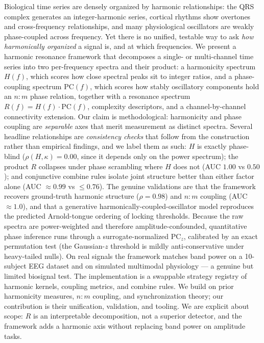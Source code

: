 \documentclass[11pt]{article}
\begin{document}
{\small Biological time series are densely organized by harmonic relationships: the QRS complex generates an integer-harmonic series, cortical rhythms show overtones and cross-frequency relationships, and many physiological oscillators are weakly phase-coupled across frequency. Yet there is no unified, testable way to ask \emph{how harmonically organized} a signal is, and at which frequencies. We present a harmonic resonance framework that decomposes a single- or multi-channel time series into two per-frequency spectra and their product: a harmonicity spectrum $H(f)$, which scores how close spectral peaks sit to integer ratios, and a phase-coupling spectrum $\mathrm{PC}(f)$, which scores how stably oscillatory components hold an $n{:}m$ phase relation, together with a resonance spectrum $R(f)=H(f)\cdot\mathrm{PC}(f)$, complexity descriptors, and a channel-by-channel connectivity extension. Our claim is methodological: harmonicity and phase coupling are \emph{separable} axes that merit measurement as distinct spectra. Several headline relationships are \emph{consistency checks} that follow from the construction rather than empirical findings, and we label them as such: $H$ is exactly phase-blind ($\rho(H,\kappa)=0.00$, since it depends only on the power spectrum); the product $R$ collapses under phase scrambling where $H$ does not (AUC $1.00$ vs $0.50$); and conjunctive combine rules isolate joint structure better than either factor alone (AUC $\approx0.99$ vs $\leq0.76$). The genuine validations are that the framework recovers ground-truth harmonic structure ($\rho=0.98$) and $n{:}m$ coupling (AUC $\approx1.0$), and that a generative harmonically-coupled-oscillator model reproduces the predicted Arnold-tongue ordering of locking thresholds. Because the raw spectra are power-weighted and therefore amplitude-confounded, quantitative phase inference runs through a surrogate-normalized $\mathrm{PC}_z$, calibrated by an exact permutation test (the Gaussian-$z$ threshold is mildly anti-conservative under heavy-tailed nulls). On real signals the framework matches band power on a 10-subject EEG dataset and on simulated multimodal physiology --- a genuine but limited biosignal test. The implementation is a swappable strategy registry of harmonic kernels, coupling metrics, and combine rules. We build on prior harmonicity measures, $n{:}m$ coupling, and synchronization theory; our contribution is their unification, validation, and tooling. We are explicit about scope: $R$ is an interpretable decomposition, not a superior detector, and the framework adds a harmonic axis without replacing band power on amplitude tasks.\par}
\vspace{10pt}
\end{document}
